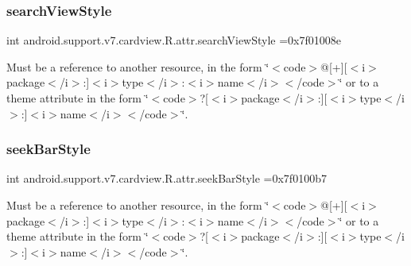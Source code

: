\subsubsection{\texorpdfstring{search\+View\+Style}{searchViewStyle}}
{\footnotesize\ttfamily int android.\+support.\+v7.\+cardview.\+R.\+attr.\+search\+View\+Style =0x7f01008e\hspace{0.3cm}{\ttfamily [static]}}

Must be a reference to another resource, in the form \char`\"{}$<$code$>$@\mbox{[}+\mbox{]}\mbox{[}$<$i$>$package$<$/i$>$\+:\mbox{]}$<$i$>$type$<$/i$>$\+:$<$i$>$name$<$/i$>$$<$/code$>$\char`\"{} or to a theme attribute in the form \char`\"{}$<$code$>$?\mbox{[}$<$i$>$package$<$/i$>$\+:\mbox{]}\mbox{[}$<$i$>$type$<$/i$>$\+:\mbox{]}$<$i$>$name$<$/i$>$$<$/code$>$\char`\"{}. \mbox{\label{classandroid_1_1support_1_1v7_1_1cardview_1_1R_1_1attr_a4b3940a1b30e07edae0bc72456dd2944}} 
\subsubsection{\texorpdfstring{seek\+Bar\+Style}{seekBarStyle}}
{\footnotesize\ttfamily int android.\+support.\+v7.\+cardview.\+R.\+attr.\+seek\+Bar\+Style =0x7f0100b7\hspace{0.3cm}{\ttfamily [static]}}

Must be a reference to another resource, in the form \char`\"{}$<$code$>$@\mbox{[}+\mbox{]}\mbox{[}$<$i$>$package$<$/i$>$\+:\mbox{]}$<$i$>$type$<$/i$>$\+:$<$i$>$name$<$/i$>$$<$/code$>$\char`\"{} or to a theme attribute in the form \char`\"{}$<$code$>$?\mbox{[}$<$i$>$package$<$/i$>$\+:\mbox{]}\mbox{[}$<$i$>$type$<$/i$>$\+:\mbox{]}$<$i$>$name$<$/i$>$$<$/code$>$\char`\"{}. \mbox{\label{classandroid_1_1support_1_1v7_1_1cardview_1_1R_1_1attr_ac1c9dfc901b203e19b077f8cb3add743}} 
